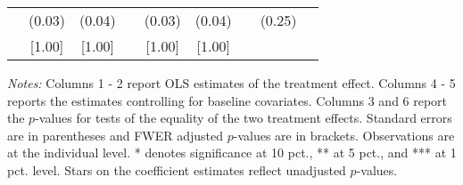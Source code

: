\begin{table}[htbp]
{\begin{threeparttable}
\begin{tabular}{l*{8}{c}}
          &   (0.03)&   (0.04)&         &   (0.03)&   (0.04)&         &   (0.25)&         \\
          &   [1.00]&   [1.00]&         &   [1.00]&   [1.00]&         &         &         \\
\bottomrule \end{tabular} \begin{tablenotes}[flushleft] \footnotesize \item \emph{Notes:} Columns 1 - 2 report OLS estimates of the treatment effect. Columns 4 - 5 reports the estimates controlling for baseline covariates. Columns 3 and 6 report the \(p\)-values for tests of the equality of the two treatment effects. Standard errors are in parentheses and FWER adjusted \(p\)-values are in brackets. Observations are at the individual level. * denotes significance at 10 pct., ** at 5 pct., and *** at 1 pct. level. Stars on the coefficient estimates reflect unadjusted \(p\)-values. \end{tablenotes} \end{threeparttable} } \end{table}

